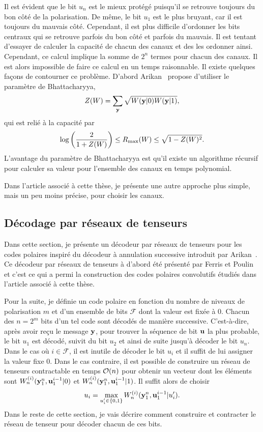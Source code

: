 Il est évident que le bit $u_n$ est le mieux protégé puisqu'il se retrouve
toujours du bon côté de la polarisation. 
De même, 
le bit $u_1$ est le plus bruyant, car il est toujours du mauvais côté.
Cependant, 
il est plus difficile d'ordonner les bits centraux qui se retrouve parfois du bon côté
et parfois du mauvais.
Il est tentant d'essayer de calculer la capacité de chacun des canaux et des les ordonner
ainsi.
Cependant, ce calcul implique la somme de $2^n$ termes pour chacun des canaux. 
Il est alors impossible de faire ce calcul en un temps raisonnable.
Il existe quelques façons de contourner ce problème.
D'abord Arikan~\cite{arikan_channel_2009} propose d'utiliser le paramètre de Bhattacharyya,
\begin{equation}
  Z(W) = \sum_{\vb y} \sqrt{W(\vb y|0)W(\vb y|1)},
\end{equation}
qui est relié à la capacité par
\begin{equation}
  \log\qty( \frac{2}{1 + Z(W)} )
  \leq  
  R_{\text{max}}(W) 
  \leq 
  \sqrt{1 - Z(W)^2} .
\end{equation}
L'avantage du paramètre de Bhattacharyya est qu'il existe un algorithme récursif pour
calculer sa valeur pour l'ensemble des canaux en temps polynomial.

Dans l'article associé à cette thèse, 
je présente une autre approche plus simple, 
mais un peu moins précise, 
pour choisir les canaux.

\subsection{Décodage par réseaux de tenseurs}

Dans cette section,
je présente un décodeur par réseaux de tenseurs pour les codes polaires 
inspiré du décodeur à annulation successive introduit par Arikan~\cite{arikan_channel_2009}.
Ce décodeur par réseaux de tenseurs à d'abord été présenté par Ferris 
et Poulin~\cite{ferris_branching_2014} et c'est ce qui a permi 
la construction des codes polaires convolutifs étudiés dans l'article associé à cette thèse.

Pour la suite, 
je définie un code polaire en fonction du nombre de niveaux de polarisation $m$
et d'un ensemble de bits $\mathcal F$ dont la valeur est fixée à 0.
Chacun des $n = 2^m$ bits d'un tel code sont décodés de manière successive.
C'est-à-dire, 
après avoir reçu le message $\vb y$,
pour trouver la séquence de bit $\vb u$ la plus probable,
le bit $u_1$ est décodé, suivit du bit $u_2$ et ainsi de suite jusqu'à décoder le bit $u_n$.
Dans le cas où $i \in \mathcal F$, 
il est inutile de décoder le bit $u_i$ et il suffit de lui assigner la valeur fixe $0$.
Dans le cas contraire,
il est possible de construire un réseau de tenseurs contractable en temps $\mathcal{O}(n)$
pour obtenir un vecteur dont les éléments sont $W_n^{(i)}(\vb y_1^n, \vb u_1^{i-1} | 0)$
et $W_n^{(i)}(\vb y_1^n, \vb u_1^{i-1} | 1)$.
Il suffit alors de choisir 
\begin{equation}
  u_i = \max_{u_i' \in \qty{0,1}} W_n^{(i)}(\vb y_1^n, \vb u_1^{i-1} | u_i').
\end{equation}
Dans le reste de cette section,
je vais décrire comment construire et contracter le réseau de tenseur
pour décoder chacun de ces bits.


